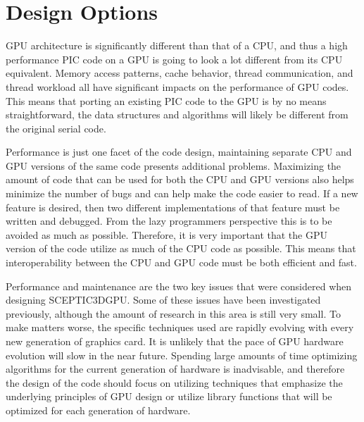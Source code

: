 \chapter{Design Options}
\label{ch:design}

GPU architecture is significantly different than that of a CPU, and thus a high performance PIC code on a GPU is going to look a lot different from its CPU equivalent. Memory access patterns, cache behavior, thread communication, and thread workload all have significant impacts on the performance of GPU codes. This means that porting an existing PIC code to the GPU is by no means straightforward, the data structures and algorithms will likely be different from the original serial code. 

Performance is just one facet of the code design, maintaining separate CPU and GPU versions of the same code presents additional problems. Maximizing the amount of code that can be used for both the CPU and GPU versions also helps minimize the number of bugs and can help make the code easier to read. If a new feature is desired, then two different implementations of that feature must be written and debugged. From the lazy programmers perspective this is to be avoided as much as possible. Therefore, it is very important that the GPU version of the code utilize as much of the CPU code as possible. This means that interoperability between the CPU and GPU code must be both efficient and fast. 

Performance and maintenance are the two key issues that were considered when designing SCEPTIC3DGPU. Some of these issues have been investigated previously, although the amount of research in this area is still very small. To make matters worse, the specific techniques used are rapidly evolving with every new generation of graphics card. It is unlikely that the pace of GPU hardware evolution will slow in the near future. Spending large amounts of time optimizing algorithms for the current generation of hardware is inadvisable, and therefore the design of the code should focus on utilizing techniques that emphasize the underlying principles of GPU design or utilize library functions that will be optimized for each generation of hardware. 

